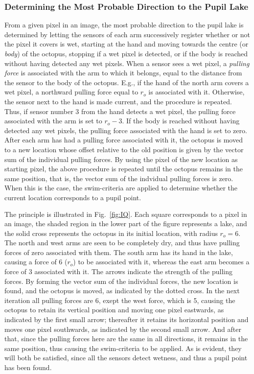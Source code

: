 \subsubsection{Determining the Most Probable Direction to the
  Pupil Lake}


From a given pixel in an image, the most probable direction to the
pupil lake is determined by letting the sensors of each arm
successively register whether or not the pixel it covers is wet,
starting at the hand and moving towards the centre (or {\em body\/})
of the octopus, stopping if a wet pixel is detected, or if the body is
reached without having detected any wet pixels.  When a sensor sees a
wet pixel, a {\em pulling force\/} is associated with the arm to which
it belongs, equal to the distance from the sensor to the body of the
octopus.  E.g., if the hand of the north arm covers a wet pixel, a
northward pulling force equal to $r_{o}$ is associated with it.
Otherwise, the sensor next to the hand is made current, and the
procedure is repeated.  Thus, if sensor number 3 from the hand detects
a wet pixel, the pulling force associated with the arm is set to
$r_{o}-3$.  If the body is reached without having detected any wet
pixels, the pulling force associated with the hand is set to zero.
After each arm has had a pulling force associated with it, the octopus
is moved to a new location whose offset relative to the old position
is given by the vector sum of the individual pulling forces.  By using
the pixel of the new location as starting pixel, the above procedure
is repeated until the octopus remains in the same position, that is,
the vector sum of the indvidual pulling forces is zero.  When this is
the case, the swim-criteria are applied to determine whether the
current location corresponds to a pupil point.

The principle is illustrated in Fig.~\ref{fig:IQ}.  Each square
corresponds to a pixel in an image, the shaded region in the lower
part of the figure represents a lake, and the solid cross represents
the octopus in its initial location, with radius $r_{o}=6$.  The north
and west arms are seen to be completely dry, and thus have pulling
forces of zero associated with them.  The south arm has its hand in
the lake, causing a force of 6 ($r_{o}$) to be associated with it,
whereas the east arm becomes a force of 3 associated with it.  The
arrows indicate the strength of the pulling forces.  By forming the
vector sum of the individual forces, the new location is found, and
the octopus is moved, as indicated by the dotted cross.  In the next
iteration all pulling forces are 6, exept the west force, which is 5,
causing the octopus to retain its vertical position and moving one
pixel eastwards, as indicated by the first small arrow; thereafter it
retains its horizontal position and moves one pixel southwards, as
indicated by the second small arrow.  And after that, since the
pulling forces here are the same in all directions, it remains in the
same position, thus causing the swim-criteria to be applied.  As is
evident, they will both be satisfied, since all the sensors detect
wetness, and thus a pupil point has been found.

